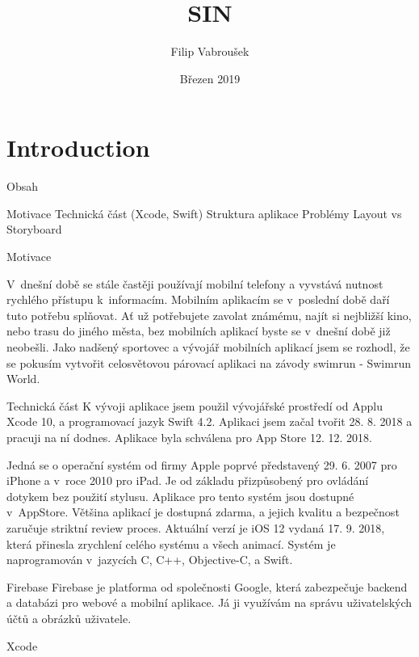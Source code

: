 \documentclass{article}
\title{SIN}
\author{Filip Vabroušek }
\date{Březen 2019}
\begin{document}
\maketitle

\section{Introduction}
Obsah

Motivace 
Technická část (Xcode, Swift) 
Struktura aplikace 
Problémy 
Layout vs Storyboard 
\vspace{10 mm}

Motivace

	V dnešní době se stále častěji používají mobilní telefony a vyvstává nutnost rychlého  přístupu k informacím. Mobilním aplikacím se v poslední době daří tuto potřebu splňovat. Ať už potřebujete zavolat známému, najít si nejbližší kino, nebo trasu do jiného města, bez mobilních aplikací byste se v dnešní době již neobešli. Jako nadšený sportovec a vývojář mobilních aplikací jsem se rozhodl, že se pokusím vytvořit celosvětovou párovací aplikaci na závody swimrun - Swimrun World.


\vspace{10 mm}
Technická část
K vývoji aplikace jsem použil vývojářské prostředí od Applu Xcode 10, a programovací jazyk Swift 4.2. Aplikaci jsem začal tvořit 28. 8. 2018 a pracuji na ní dodnes. Aplikace byla schválena pro App Store 12. 12. 2018. 


\vspace{10 mm}

	Jedná se o operační systém od firmy Apple poprvé představený 29. 6. 2007 pro iPhone a v roce 2010 pro iPad.  Je od základu přizpůsobený pro ovládání dotykem bez použití stylusu. Aplikace pro tento systém jsou dostupné v AppStore. Většina aplikací je dostupná zdarma, a jejich kvalitu a bezpečnost zaručuje striktní review proces. Aktuální verzí je iOS 12 vydaná 17. 9. 2018, která přinesla zrychlení celého systému a všech animací. Systém je naprogramován v jazycích C, C++, Objective-C, a Swift.

\vspace{10 mm}
 Firebase
	Firebase je platforma od společnosti Google, která zabezpečuje backend a databázi pro webové a mobilní aplikace. Já ji využívám na správu uživatelských účtů a obrázků uživatele.



\vspace{10 mm}
Xcode
\end{document}
